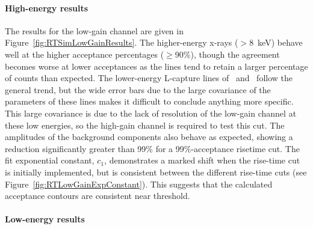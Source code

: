 					\paragraph{High-energy results}

The results for the low-gain channel are given in Figure~\ref{fig:RTSimLowGainResults}.  The higher-energy x-rays ($>8$~keV) behave well at the higher acceptance percentages ($\ge$90\%), though the agreement becomes worse at lower acceptances as the lines tend to retain a larger percentage of counts than expected.  The lower-energy L-capture lines of \gersixeight~and \znsixfive~follow the general trend, but the wide error bars due to the large covariance of the parameters of these lines makes it difficult to conclude anything more specific.  This large covariance is due to the lack of resolution of the low-gain channel at these low energies, so the high-gain channel is required to test this cut.  The amplitudes of the background components also behave as expected, showing a reduction significantly greater than 99\% for a 99\%-acceptance risetime cut.  The fit exponential constant, $c_{1}$, demonstrates a marked shift when the rise-time cut is initially implemented, but is consistent between the different rise-time cuts (see Figure~\ref{fig:RTLowGainExpConstant}).  This suggests that the calculated acceptance contours are consistent near threshold.  


						\begin{sidewaysfigure}
							\centering
							\caption[Simulation results for low-gain BeGe channel]
							{Simulation results for low-gain channel.}
							\label{fig:RTSimLowGainResults}
						\end{sidewaysfigure}

					\paragraph{Low-energy results}

